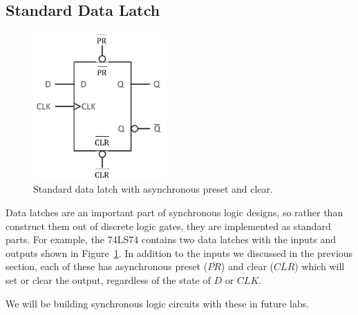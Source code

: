 \documentclass[12pt]{article}
\begin{document}
\subsection*{Standard Data Latch}
\begin{figure}[!h]
\centerline{\includegraphics[width=2in]{figs/d-latch-7474.pdf}}
\caption{Standard data latch with asynchronous preset and clear.}
\label{fig:d-latch-7474}
\end{figure}

Data latches are an important part of synchronous logic designs, so rather than construct them out of discrete logic gates, 
they are implemented as standard parts.  For example, the 74LS74  contains two data latches with the 
inputs and outputs shown in Figure~\ref{fig:d-latch-7474}.  In addition to the inputs we discussed in the previous section,
each of these has  asynchronous preset ($\overline{PR}$) and clear ($\overline{CLR}$) which will set or clear the output, regardless of the state of $D$ or $CLK$.

We will be building synchronous logic circuits with these in future labs.
\end{document}
